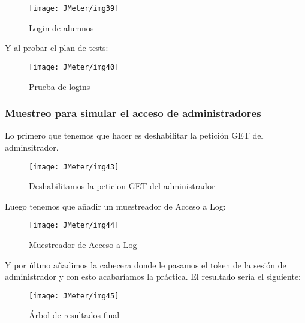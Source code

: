 \begin{figure}[H]
    \centering
    \texttt{[image: JMeter/img39]}
    \caption{Login de alumnos}
\end{figure}

Y al probar el plan de tests:

\begin{figure}[H]
    \centering
    \texttt{[image: JMeter/img40]}
    \caption{Prueba de logins}
\end{figure}

\subsubsection{Muestreo para simular el acceso de administradores}
Lo primero que tenemos que hacer es deshabilitar la petición GET del adminsitrador.

\begin{figure}[H]
    \centering
    \texttt{[image: JMeter/img43]}
    \caption{Deshabilitamos la peticion GET del administrador}
\end{figure}

Luego tenemos que añadir un muestreador de Acceso a Log:

\begin{figure}[H]
    \centering
    \texttt{[image: JMeter/img44]}
    \caption{Muestreador de Acceso a Log}
\end{figure}

Y por últmo añadimos la cabecera donde le pasamos el token de la sesión de administrador y con esto acabaríamos la práctica.
El resultado sería el siguiente:

\begin{figure}[H]
    \centering
    \texttt{[image: JMeter/img45]}
    \caption{Árbol de resultados final}
\end{figure}